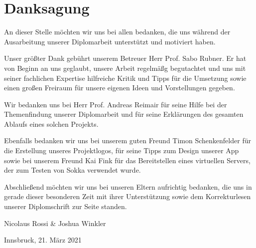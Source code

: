 \section*{Danksagung}

An dieser Stelle möchten wir uns bei allen bedanken, die uns während der Ausarbeitung unserer Diplomarbeit unterstützt und motiviert haben.

Unser größter Dank gebührt unserem Betreuer Herr Prof. Sabo Rubner. Er hat von Beginn an uns geglaubt, unsere Arbeit regelmäßg begutachtet und uns mit seiner fachlichen Expertise hilfreiche Kritik und Tipps für die Umsetzung sowie einen großen Freiraum für unsere eigenen Ideen und Vorstellungen gegeben.

Wir bedanken uns bei Herr Prof. Andreas Reimair für seine Hilfe bei der Themenfindung unserer Diplomarbeit und für seine Erklärungen des gesamten Ablaufs eines solchen Projekts.

Ebenfalls bedanken wir uns bei unserem guten Freund Timon Schenkenfelder für die Erstellung unseres Projektlogos, für seine Tipps zum Design unserer App sowie bei unserem Freund Kai Fink für das Bereitstellen eines virtuellen Servers, der zum Testen von Sokka verwendet wurde.

Abschließend möchten wir uns bei unseren Eltern aufrichtig bedanken, die uns in gerade dieser besonderen Zeit mit ihrer Unterstützung sowie dem Korrekturlesen unserer Diplomschrift zur Seite standen.

\vspace{1cm}

Nicolaus Rossi \& Joshua Winkler

Innsbruck, 21. März 2021

\newpage